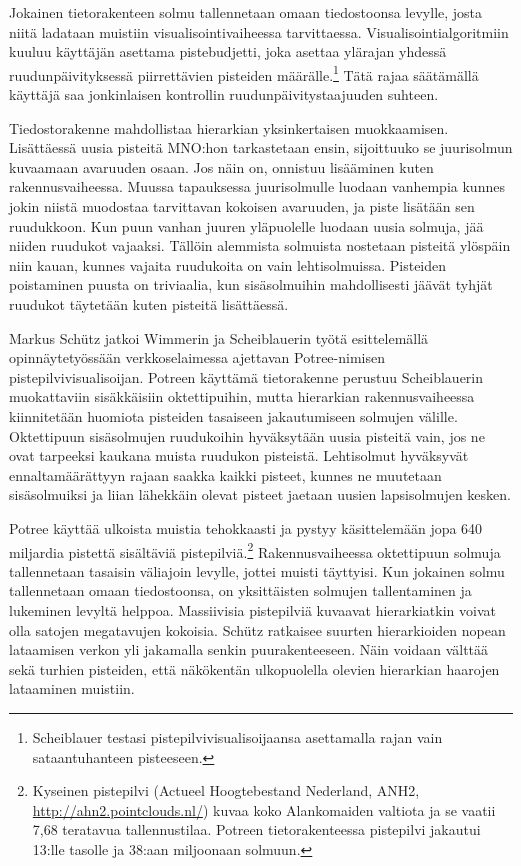 Jokainen tietorakenteen solmu tallennetaan omaan tiedostoonsa levylle, josta niitä ladataan muistiin visualisointivaiheessa tarvittaessa. Visualisointialgoritmiin kuuluu käyttäjän asettama pistebudjetti, joka asettaa ylärajan yhdessä ruudunpäivityksessä piirrettävien pisteiden määrälle.\footnote{Scheiblauer testasi pistepilvivisualisoijaansa asettamalla rajan vain sataantuhanteen pisteeseen.} Tätä rajaa säätämällä käyttäjä saa jonkinlaisen kontrollin ruudunpäivitystaajuuden suhteen. \cite{scheiblauer}

Tiedostorakenne mahdollistaa hierarkian yksinkertaisen muokkaamisen. Lisättäessä uusia pisteitä MNO:hon tarkastetaan ensin, sijoittuuko se juurisolmun kuvaamaan avaruuden osaan. Jos näin on, onnistuu lisääminen kuten rakennusvaiheessa. Muussa tapauksessa juurisolmulle luodaan vanhempia kunnes jokin niistä muodostaa tarvittavan kokoisen avaruuden, ja piste lisätään sen ruudukkoon. Kun puun vanhan juuren yläpuolelle luodaan uusia solmuja, jää niiden ruudukot vajaaksi. Tällöin alemmista solmuista nostetaan pisteitä ylöspäin niin kauan, kunnes vajaita ruudukoita on vain lehtisolmuissa. Pisteiden poistaminen puusta on triviaalia, kun sisäsolmuihin mahdollisesti jäävät tyhjät ruudukot täytetään kuten pisteitä lisättäessä. \cite{scheiblauer}


Markus Schütz jatkoi Wimmerin ja Scheiblauerin työtä esittelemällä opinnäytetyössään verkkoselaimessa ajettavan Potree-nimisen pistepilvivisualisoijan. Potreen käyttämä tietorakenne perustuu Scheiblauerin muokattaviin sisäkkäisiin oktettipuihin, mutta hierarkian rakennusvaiheessa kiinnitetään huomiota pisteiden tasaiseen jakautumiseen solmujen välille. Oktettipuun sisäsolmujen ruudukoihin hyväksytään uusia pisteitä vain, jos ne ovat tarpeeksi kaukana muista ruudukon pisteistä. Lehtisolmut hyväksyvät ennaltamäärättyyn rajaan saakka kaikki pisteet, kunnes ne muutetaan sisäsolmuiksi ja liian lähekkäin olevat pisteet jaetaan uusien lapsisolmujen kesken. \cite{potree}

Potree käyttää ulkoista muistia tehokkaasti ja pystyy käsittelemään jopa 640 miljardia pistettä sisältäviä pistepilviä.\footnote{Kyseinen pistepilvi (Actueel Hoogtebestand Nederland, ANH2, \url{http://ahn2.pointclouds.nl/}) kuvaa koko Alankomaiden valtiota ja se vaatii 7,68 teratavua tallennustilaa. Potreen tietorakenteessa pistepilvi jakautui 13:lle tasolle ja 38:aan miljoonaan solmuun.} Rakennusvaiheessa oktettipuun solmuja tallennetaan tasaisin väliajoin levylle, jottei muisti täyttyisi. Kun jokainen solmu tallennetaan omaan tiedostoonsa, on yksittäisten solmujen tallentaminen ja lukeminen levyltä helppoa. Massiivisia pistepilviä kuvaavat hierarkiatkin voivat olla satojen megatavujen kokoisia. Schütz ratkaisee suurten hierarkioiden nopean lataamisen verkon yli jakamalla senkin puurakenteeseen. Näin voidaan välttää sekä turhien pisteiden, että näkökentän ulkopuolella olevien hierarkian haarojen lataaminen muistiin. \cite{potree}

